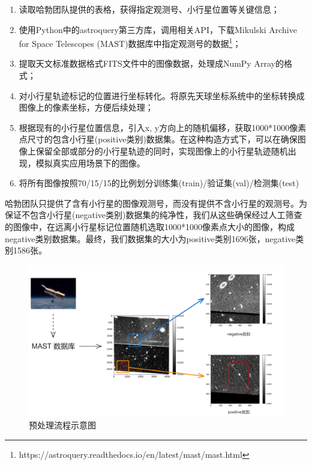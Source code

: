 \documentclass[12pt,a4paper]{article}%
\begin{document}
\begin{enumerate}[1.]%
    \item 读取哈勃团队提供的表格，获得指定观测号、小行星位置等关键信息；
    \item 使用Python中的astroquery第三方库，调用相关API，下载Mikulski Archive for Space Telescopes (MAST)数据库中指定观测号的数据\footnote{https://astroquery.readthedocs.io/en/latest/mast/mast.html}；
    \item 提取天文标准数据格式FITS文件中的图像数据，处理成NumPy Array的格式；
    \item 对小行星轨迹标记的位置进行坐标转化。将原先天球坐标系统中的坐标转换成图像上的像素坐标，方便后续处理；
    \item 根据现有的小行星位置信息，引入x, y方向上的随机偏移，获取1000*1000像素点尺寸的包含小行星(positive类别)数据集。在这种构造方式下，可以在确保图像上保留全部或部分的小行星轨迹的同时，实现图像上的小行星轨迹随机出现，模拟真实应用场景下的图像。
    \item 将所有图像按照70/15/15的比例划分训练集(train)/验证集(val)/检测集(test)
\end{enumerate}

哈勃团队只提供了含有小行星的图像观测号，而没有提供不含小行星的观测号。为保证不包含小行星(negative类别)数据集的纯净性，我们从这些确保经过人工筛查的图像中，在远离小行星标记位置随机选取1000*1000像素点大小的图像，构成negative类别数据集。最终，我们数据集的大小为positive类别1696张，negative类别1586张。

\begin{figure}[H]%
    \centering
    \begin{minipage}{1.0\textwidth}%
        \centering
        \includegraphics[width=1.0%
            \textwidth]{preprocess.png}%
        \caption{\fontsize{10pt}{15pt}\selectfont 预处理流程示意图}%
    \end{minipage}
\end{figure}
\end{document}
